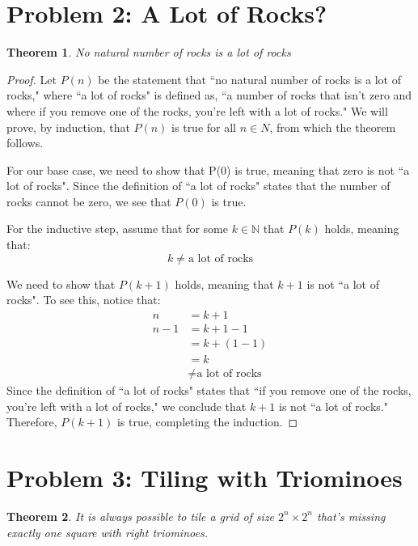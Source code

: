 \documentclass[10pt,letter]{article}
\newtheorem*{thm}{Theorem}
\begin{document}
\pagebreak

\section*{Problem 2: A Lot of Rocks?}

\begin{thm}No natural number of rocks is a lot of rocks\end{thm}
\begin{proof}
Let $P(n)$ be the statement that ``no natural number of rocks is a lot of rocks," where ``a lot of rocks" is defined as, ``a number of rocks that isn't zero and where if you remove one of the rocks, you're left with a lot of rocks." We will prove, by induction, that $P(n)$ is true for all $n \in N$, from which the theorem follows. 

\item For our base case, we need to show that P(0) is true, meaning that zero is not ``a lot of rocks". Since the definition of ``a lot of rocks" states that the number of rocks cannot be zero, we see that $P(0)$ is true.

\item For the inductive step, assume that for some $k \in \mathbb{N}$ that $P(k)$ holds, meaning that:
\begin{equation} \label{eq:2}
k \neq \mbox{a lot of rocks}
\end{equation}

\item We need to show that $P(k+1)$ holds, meaning that $k+1$ is not ``a lot of rocks". To see this, notice that:
\begin{align*}
n &= k+1\\
n-1 &= k+1-1 \tag{remove one rock}\\ 
&= k+(1-1)\\
&= k\\
&\neq \mbox{a lot of rocks} \tag{via (2)}
\end{align*}
Since the definition of ``a lot of rocks" states that ``if you remove one of the rocks, you're left with a lot of rocks," we conclude that $k+1$ is not ``a lot of rocks." Therefore, $P(k+1)$ is true, completing the induction. 
\end{proof}

\section*{Problem 3: Tiling with Triominoes}
\begin{thm}
  It is always possible to tile a grid of size $2^n \times 2^n$ that's missing exactly one square with right triominoes.
\end{thm}
\end{document}
